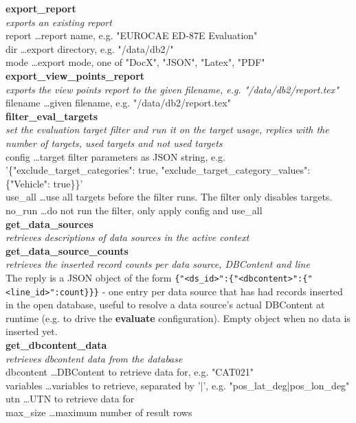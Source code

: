 \textbf{export\_report} \\
\textit{exports an existing report} \\
report \dots report name, e.g. "EUROCAE ED-87E Evaluation" \\
dir \dots export directory, e.g. "/data/db2/" \\
mode \dots export mode, one of "DocX", "JSON", "Latex", "PDF" \\

\textbf{export\_view\_points\_report} \\
\textit{exports the view points report to the given filename, e.g. "/data/db2/report.tex"} \\
filename \dots given filename, e.g. "/data/db2/report.tex" \\

\textbf{filter\_eval\_targets} \\
\textit{set the evaluation target filter and run it on the target usage, replies with the number of targets, used targets and not used targets} \\
config \dots target filter parameters as JSON string, e.g. '\{"exclude\_target\_categories": true, "exclude\_target\_category\_values": \{"Vehicle": true\}\}' \\
use\_all \dots use all targets before the filter runs. The filter only disables targets. \\
no\_run \dots do not run the filter, only apply config and use\_all \\

\textbf{get\_data\_sources} \\
\textit{retrieves descriptions of data sources in the active context} \\

\textbf{get\_data\_source\_counts} \\
\textit{retrieves the inserted record counts per data source, DBContent and line} \\
The reply is a JSON object of the form
\texttt{\{"<ds\_id>":\{"<dbcontent>":\{"<line\_id>":count\}\}\}} - one entry per
data source that has had records inserted in the open database, useful to
resolve a data source's actual DBContent at runtime (e.g. to drive the
\textbf{evaluate} configuration). Empty object when no data is inserted yet. \\

\textbf{get\_dbcontent\_data} \\
\textit{retrieves dbcontent data from the database} \\
dbcontent \dots DBContent to retrieve data for, e.g. "CAT021" \\
variables \dots variables to retrieve, separated by '|', e.g. "pos\_lat\_deg|pos\_lon\_deg" \\
utn \dots UTN to retrieve data for \\
max\_size \dots maximum number of result rows \\

